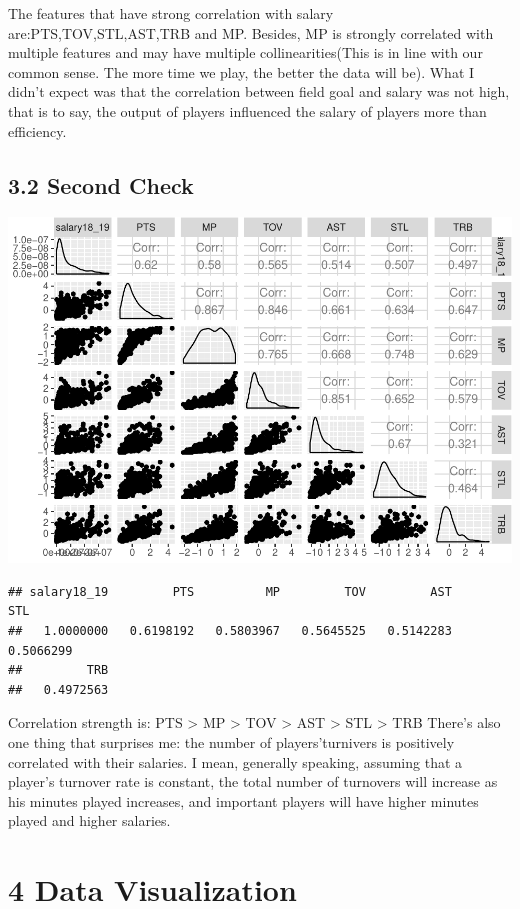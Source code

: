 \documentclass[]{article}
\begin{document}
The features that have strong correlation with salary
are:PTS,TOV,STL,AST,TRB and MP. Besides, MP is strongly correlated with
multiple features and may have multiple collinearities(This is in line
with our common sense. The more time we play, the better the data will
be). What I didn't expect was that the correlation between field goal
and salary was not high, that is to say, the output of players
influenced the salary of players more than efficiency.

\subsection{3.2 Second Check}\label{second-check}

\includegraphics{Final_Report_files/figure-latex/unnamed-chunk-12-1.pdf}

\begin{verbatim}
## salary18_19         PTS          MP         TOV         AST         STL 
##   1.0000000   0.6198192   0.5803967   0.5645525   0.5142283   0.5066299 
##         TRB 
##   0.4972563
\end{verbatim}

Correlation strength is: PTS \textgreater{} MP \textgreater{} TOV
\textgreater{} AST \textgreater{} STL \textgreater{} TRB There's also
one thing that surprises me: the number of players'turnivers is
positively correlated with their salaries. I mean, generally speaking,
assuming that a player's turnover rate is constant, the total number of
turnovers will increase as his minutes played increases, and important
players will have higher minutes played and higher salaries.

\section{4 Data Visualization}\label{data-visualization}
\end{document}
